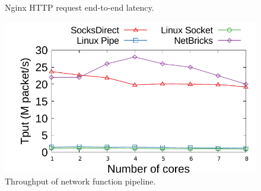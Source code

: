 \begin{figure}[t!]
\begin{minipage}{.31\textwidth}
		\vspace{-15pt}
		\caption{Nginx HTTP request end-to-end latency.}
		\label{fig:eval-nginx}
	\end{minipage}
	\hspace{0.02\textwidth}
	\begin{minipage}{.31\textwidth}
		\centering
		\includegraphics[width=\textwidth]{eval/microbenchmark/nfv-tun-tput.pdf}
		\vspace{-15pt}
		\caption{Throughput of network function pipeline.}
		\label{fig:eval-tun-tput}
		
		
	\end{minipage}
	\vspace{-15pt}
\end{figure}

\begin{figure}[t!]
	\centering

	\hspace{0.01\textwidth}
		

	\vspace{-15pt}
\end{figure}


